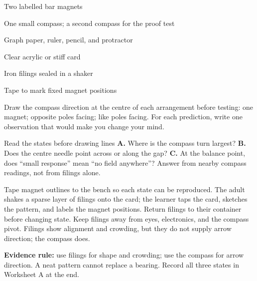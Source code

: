 
\begin{materials}
\item Two labelled bar magnets
\item One small compass; a second compass for the proof test
\item Graph paper, ruler, pencil, and protractor
\item Clear acrylic or stiff card
\item Iron filings sealed in a shaker
\item Tape to mark fixed magnet positions
\end{materials}

\begin{predict}
Draw the compass direction at the centre of each arrangement before testing:
one magnet; opposite poles facing; like poles facing. For each prediction,
write one observation that would make you change your mind.
\end{predict}

\magnetstates

\begin{telospanel}{Read the states before drawing lines}
\textbf{A.} Where is the compass turn largest? \quad
\textbf{B.} Does the centre needle point across or along the gap? \quad
\textbf{C.} At the balance point, does ``small response'' mean ``no field
anywhere''? Answer from nearby compass readings, not from filings alone.
\end{telospanel}

Tape magnet outlines to the bench so each state can be reproduced. The adult
shakes a sparse layer of filings onto the card; the learner taps the card,
sketches the pattern, and labels the magnet positions. Return filings to their
container before changing state. Keep filings away from eyes, electronics, and
the compass pivot. Filings show alignment and crowding, but they do not supply
arrow direction; the compass does.

\begin{telosframe}
\textbf{Evidence rule:} use filings for shape and crowding; use the compass for
arrow direction. A neat pattern cannot replace a bearing. Record all three
states in Worksheet A at the end.
\end{telosframe}

